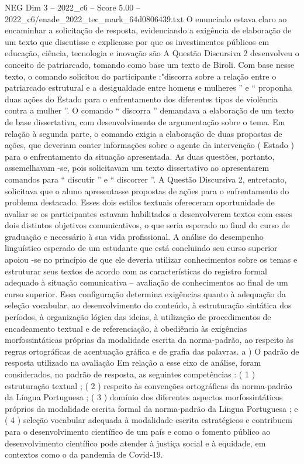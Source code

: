 \begin{textsample}{NEG Dim 3 – 2022\_c6 – Score 5.00 – 2022\_c6/enade\_2022\_tec\_mark\_64d0806439.txt}
O enunciado estava claro ao encaminhar a solicitação de resposta, evidenciando a exigência de elaboração de um texto que discutisse e explicasse por que os investimentos públicos em educação, ciência, tecnologia e inovação são A Questão Discursiva 2 desenvolveu o conceito de patriarcado, tomando como base um texto de Biroli.
Com base nesse texto, o comando solicitou do participante :"discorra sobre a relação entre o patriarcado estrutural e a desigualdade entre homens e mulheres ” e “ proponha duas ações do Estado para o enfrentamento dos diferentes tipos de violência contra a mulher ”.
O comando “ discorra ” demandava a elaboração de um texto de base dissertativa, com desenvolvimento de argumentação sobre o tema.
Em relação à segunda parte, o comando exigia a elaboração de duas propostas de ações, que deveriam conter informações sobre o agente da intervenção ( Estado ) para o enfrentamento da situação apresentada.
As duas questões, portanto, assemelhavam -se, pois solicitavam um texto dissertativo ao apresentarem comandos para “ discutir ” e “ discorrer ”.
A Questão Discursiva 2, entretanto, solicitava que o aluno apresentasse propostas de ações para o enfrentamento do problema destacado.
Esses dois estilos textuais ofereceram oportunidade de avaliar se os participantes estavam habilitados a desenvolverem textos com esses dois distintos objetivos comunicativos, o que seria esperado ao final do curso de graduação e necessário à sua vida profissional.
A análise do desempenho linguístico esperado de um estudante que está concluindo seu curso superior apoiou -se no princípio de que ele deveria utilizar conhecimentos sobre os temas e estruturar seus textos de acordo com as características do registro formal adequado à situação comunicativa – avaliação de conhecimentos ao final de um curso superior.
Essa configuração determina exigências quanto à adequação da seleção vocabular, ao desenvolvimento do conteúdo, à estruturação sintática dos períodos, à organização lógica das ideias, à utilização de procedimentos de encadeamento textual e de referenciação, à obediência às exigências morfossintáticas próprias da modalidade escrita da norma-padrão, ao respeito às regras ortográficas de acentuação gráfica e de grafia das palavras. a ) O padrão de resposta utilizado na avaliação Em relação a esse eixo de análise, foram considerados, no padrão de resposta, as seguintes competências : ( 1 ) estruturação textual ; ( 2 ) respeito às convenções ortográficas da norma-padrão da Língua Portuguesa ; ( 3 ) domínio dos diferentes aspectos morfossintáticos próprios da modalidade escrita formal da norma-padrão da Língua Portuguesa ; e ( 4 ) seleção vocabular adequada à modalidade escrita estratégicos e contribuem para o desenvolvimento científico de um país e como o fomento público ao desenvolvimento científico pode atender à justiça social e à equidade, em contextos como o da pandemia de Covid-19.

\end{textsample}
